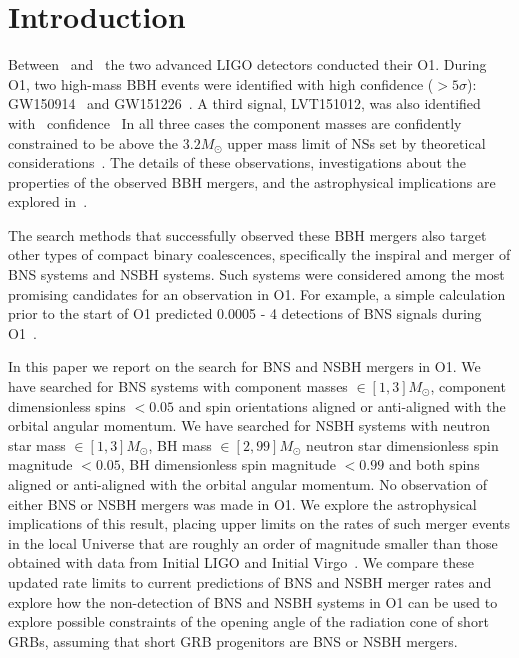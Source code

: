 \documentclass[twocolumn]{aastex6}
\begin{document}


\section{Introduction}

Between \OoneSTART\ and \OoneEND\, the two advanced \ac{LIGO} detectors conducted their \ac{O1}.
During \ac{O1}, two high-mass \ac{BBH} events
were identified with high confidence ($> 5 \sigma$): GW150914~\citep{Abbott:2016blz} and
GW151226~\citep{Abbott:2016nmj}. A third signal, LVT151012, was
also identified with \LVBLAHsignificance\ confidence~\citep{TheLIGOScientific:2016pea, TheLIGOScientific:2016qqj}
In all three cases the component masses are confidently constrained to be above the $3.2M_\odot$ upper mass limit of \acp{NS} set
by theoretical considerations~\citep{Rhoades:1974fn,TheLIGOScientific:2016wfe}.
The details of these observations, investigations about the properties
of the observed \ac{BBH} mergers, and the astrophysical implications are explored
in~\citep{TheLIGOScientific:2016wfe,Abbott:2016nhf,TheLIGOScientific:2016htt,TheLIGOScientific:2016src,TheLIGOScientific:2016pea, Abbott:2016izl}.

The search methods that successfully observed these \ac{BBH} mergers also target other types of compact
binary coalescences, specifically the inspiral and merger of \ac{BNS} systems and \ac{NSBH} systems. Such systems were considered
among the most promising candidates for an observation in \ac{O1}. For example, a simple calculation
prior to the start of O1 predicted 0.0005 - 4 detections of \ac{BNS}
signals during O1~\citep{Aasi:2013wya}.

In this paper we report on the search for \ac{BNS} and \ac{NSBH} mergers in \ac{O1}. We have
searched for \ac{BNS} systems with component masses $\in [1,3] M_{\odot}$, component dimensionless
spins $< 0.05$ and spin orientations aligned or anti-aligned with the orbital angular momentum.
We have searched for \ac{NSBH} systems with neutron star mass $\in [1,3] M_{\odot}$,
\ac{BH} mass $\in [2,99] M_{\odot}$ neutron star dimensionless spin magnitude $< 0.05$,
\ac{BH} dimensionless spin magnitude $<0.99$ and both spins
aligned or anti-aligned with the orbital angular momentum.
No observation of
either \ac{BNS} or \ac{NSBH} mergers was made in \ac{O1}. We explore the astrophysical implications
of this result, placing upper limits on the rates of such merger events in the
local Universe that
are roughly an order of magnitude smaller than those obtained with data from Initial \ac{LIGO}
and Initial Virgo~\citep{Abbott:2007kv,Acernese:2008zzf,Colaboration:2011np}.
We compare these updated rate limits to current predictions of \ac{BNS} and
\ac{NSBH} merger rates and explore how the non-detection of \ac{BNS} and \ac{NSBH} systems in \ac{O1} can be used
to explore possible constraints of the opening angle of the radiation cone of short \acp{GRB},
assuming that short \ac{GRB} progenitors are \ac{BNS} or \ac{NSBH} mergers.
\end{document}
